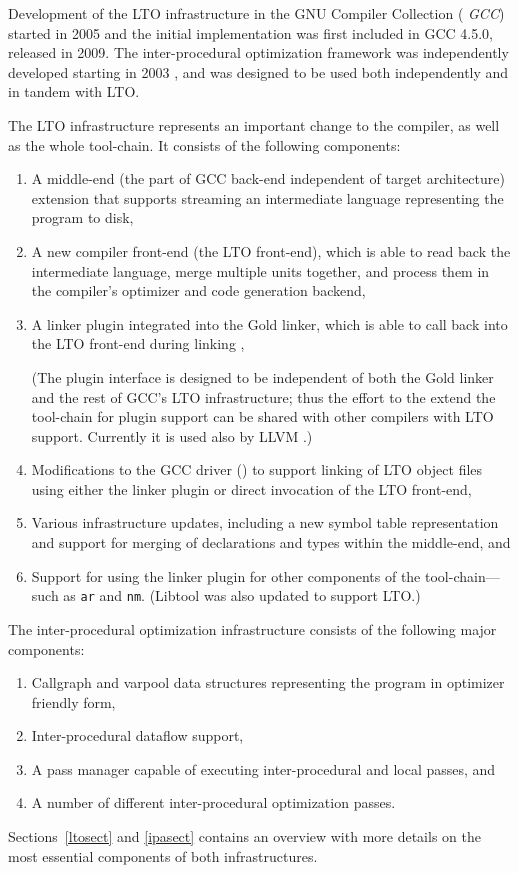 \documentclass[final]{ols}
\begin{document}
Development of the LTO infrastructure in the GNU Compiler Collection ({\em
GCC}) started in 2005 \cite{LTOproposal} and the initial implementation was
first included in GCC 4.5.0, released in 2009.  The inter-procedural
optimization framework was independently developed starting in 2003
\cite{callgraph}, and was designed to be used both independently and in tandem
with LTO.

The LTO infrastructure represents an important change to the compiler, as well
as the whole tool-chain. It consists of the following components:
\begin{enumerate}
  \item A middle-end (the part of GCC back-end independent of target
architecture) extension that supports streaming an intermediate
language representing the program to disk,
  \item A new compiler front-end (the LTO front-end), which is able to read back the intermediate
language, merge multiple units together, and process them in the compiler's
optimizer and code generation backend,
  \item A linker plugin integrated into the Gold linker, which is able to call back
into the LTO front-end during linking \cite{plugin}, %

(The plugin interface is designed to be independent of both the Gold linker and the
rest of GCC's LTO infrastructure; thus the effort to the extend the tool-chain for plugin
support can be shared with other compilers with LTO support. Currently
it is used also by LLVM \cite{LLVM}.)
  \item Modifications to the GCC driver () to support linking of
LTO object files using either the linker plugin or direct invocation of the
LTO front-end,
  \item Various infrastructure updates, including a new symbol table representation and support 
for merging of declarations and types within the middle-end, and
  \item Support for using the linker plugin for other components of the
tool-chain---such as {\tt ar} and {\tt nm}.  (Libtool was also updated to
support LTO.)
\end{enumerate}
The inter-procedural optimization infrastructure consists of the following major components:
\begin{enumerate}
  \item Callgraph and varpool data structures representing the program in
optimizer friendly form,
  \item Inter-procedural dataflow support,
  \item A pass manager capable of executing inter-procedural and local passes, and
  \item A number of different inter-procedural optimization passes.
\end{enumerate}
Sections~\ref{ltosect} and \ref{ipasect} contains an overview with more details
on the most essential components of both infrastructures.
\end{document}
